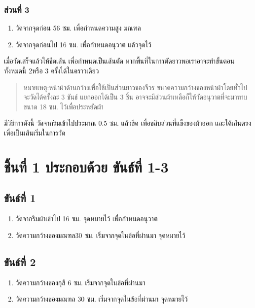 \subsubsection{ส่วนที่ 3}

\begin{enumerate}
\def\labelenumi{(\arabic{enumi})}
\item
  วัดจากจุดก่อน 56 ซม. เพื่อกำหนดความสูง มณฑล
\item
  วัดจากจุดก่อนไป 16 ซม. เพื่อกำหนดอนุวาต แล้วจุดไว้
\end{enumerate}

เมื่อวัดเสร็จแล้วให้ขีดเส้น เพื่อกำหนดเป็นเส้นตัด
หากพื้นที่ในการตัดยาวพอเราอาจะทำขั้นตอนทั้งหมดนี้ 2หรือ 3
ครั้งได้ในคราวเดียว

\begin{quote}
หมายเหตุ:หน้าผ้าด้านกว้างเพื่อใช้เป็นส่วนยาวของจีวร
ขนาดความกว้างของหน้าผ้าโดยทั่วไป จะวัดได้ครั้งละ 3 ขันธ์ แยกออกได้เป็น 3
ชิ้น อาจจะมีส่วนผ้าเหลือก็ให้วัดอนุวาตที่จะมาทาบขนาด 18 ซม.
ไว้เพื่อประหยัดผ้า
\end{quote}

มีวิธีการดังนี้ วัดจากริมเข้าไปประมาณ 0.5 ซม. แล้วขีด
เพื่อขลิบส่วนที่แข็งของผ้าออก และได้เส้นตรงเพื่อเป็นเส้นเริ่มในการวัด

\section{ชิ้นที่ 1 ประกอบด้วย ขันธ์ที่ 1-3}

\subsection{ขันธ์ที่ 1}

\begin{enumerate}
\def\labelenumi{(\arabic{enumi})}
\item
  วัดจากริมผ้าเข้าไป 16 ซม. จุดหมายไว้ เพื่อกำหนดอนุวาต
\item
  วัดความกว้างของมณฑล30 ซม. เริ่มจากจุดในข้อที่ผ่านมา จุดหมายไว้
\end{enumerate}

\subsection{ขันธ์ที่ 2}

\begin{enumerate}
\def\labelenumi{(\arabic{enumi})}
\item
  วัดความกว้างของกุสิ 6 ซม. เริ่มจากจุดในข้อที่ผ่านมา
\item
  วัดความกว้างของมณฑล 30 ซม. เริ่มจากจุดในข้อที่ผ่านมา จุดหมายไว้
\end{enumerate}

